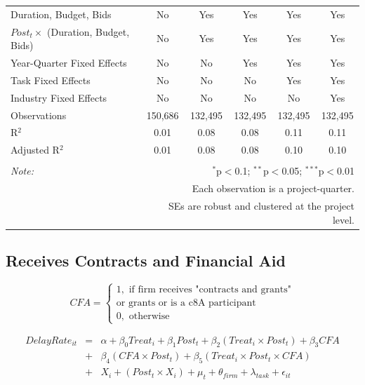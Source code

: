 \documentclass[
]{article}
\begin{document}
\begin{table}[H]
\begin{tabular}{@{\extracolsep{-2pt}}lccccc}
Duration, Budget, Bids & No & Yes & Yes & Yes & Yes \\ 
$Post_t \times $  (Duration, Budget, Bids) & No & Yes & Yes & Yes & Yes \\ 
Year-Quarter Fixed Effects & No & No & Yes & Yes & Yes \\ 
Task Fixed Effects & No & No & No & Yes & Yes \\ 
Industry Fixed Effects & No & No & No & No & Yes \\ 
Observations & 150,686 & 132,495 & 132,495 & 132,495 & 132,495 \\ 
R$^{2}$ & 0.01 & 0.08 & 0.08 & 0.11 & 0.11 \\ 
Adjusted R$^{2}$ & 0.01 & 0.08 & 0.08 & 0.10 & 0.10 \\ 
\hline 
\hline \\[-1.8ex] 
\textit{Note:}  & \multicolumn{5}{r}{$^{*}$p$<$0.1; $^{**}$p$<$0.05; $^{***}$p$<$0.01} \\ 
 & \multicolumn{5}{r}{Each observation is a project-quarter.} \\ 
 & \multicolumn{5}{r}{SEs are robust and clustered at the project level.} \\ 
\end{tabular} 
\end{table}

\hypertarget{receives-contracts-and-financial-aid}{%
\subsection{Receives Contracts and Financial
Aid}\label{receives-contracts-and-financial-aid}}

\[ CFA = \begin{cases} 1, \text{ if firm receives "contracts and grants"}\\ 
                       \text{or grants or is a c8A participant}\\
0, \text{ otherwise} \end{cases}\]

\[ \begin{aligned}
DelayRate_{it} &=& \alpha+\beta_0 Treat_i + \beta_1 Post_t + \beta_2 (Treat_i \times Post_t) +\beta_3 CFA \\
&+& \beta_4 (CFA \times Post_t) + \beta_5 (Treat_i \times Post_t \times CFA) \\ 
&+&X_i + (Post_t \times X_i) + \mu_t + \theta_{firm} + \lambda_{task}+ \epsilon_{it}
\end{aligned}\]
\end{document}

